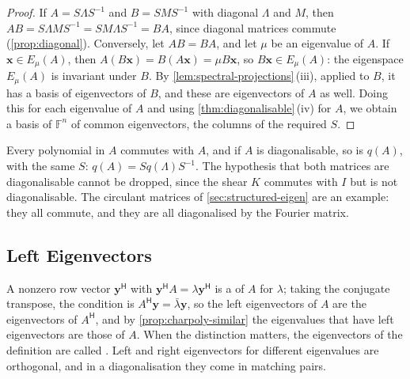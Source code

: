 \begin{proof}
If $A=S\Lambda S^{-1}$ and $B=SMS^{-1}$ with diagonal $\Lambda$ and $M$, then $AB=S\Lambda MS^{-1}=SM\Lambda S^{-1}=BA$, since diagonal matrices commute (\cref{prop:diagonal}). Conversely, let $AB=BA$, and let $\mu$ be an eigenvalue of $A$. If $\mathbf x\in E_\mu(A)$, then $A(B\mathbf x)=B(A\mathbf x)=\mu B\mathbf x$, so $B\mathbf x\in E_\mu(A)$: the eigenspace $E_\mu(A)$ is invariant under $B$. By \cref{lem:spectral-projections}\,(iii), applied to $B$, it has a basis of eigenvectors of $B$, and these are eigenvectors of $A$ as well. Doing this for each eigenvalue of $A$ and using \cref{thm:diagonalisable}\,(iv) for $A$, we obtain a basis of $\mathbb F^n$ of common eigenvectors, the columns of the required $S$.
\end{proof}

Every polynomial in $A$ commutes with $A$, and if $A$ is diagonalisable, so is $q(A)$, with the same $S$: $q(A)=Sq(\Lambda)S^{-1}$. The hypothesis that both matrices are diagonalisable cannot be dropped, since the shear $K$ commutes with $I$ but is not diagonalisable. The circulant matrices of \cref{sec:structured-eigen} are an example: they all commute, and they are all diagonalised by the Fourier matrix.

\subsection{Left Eigenvectors}

A nonzero row vector $\mathbf y^{\mathsf H}$ with $\mathbf y^{\mathsf H}A=\lambda\mathbf y^{\mathsf H}$ is a  of $A$ for $\lambda$; taking the conjugate transpose, the condition is $A^{\mathsf H}\mathbf y=\bar\lambda\mathbf y$, so the left eigenvectors of $A$ are the eigenvectors of $A^{\mathsf H}$, and by \cref{prop:charpoly-similar} the eigenvalues that have left eigenvectors are those of $A$. When the distinction matters, the eigenvectors of the definition are called . Left and right eigenvectors for different eigenvalues are orthogonal, and in a diagonalisation they come in matching pairs.

